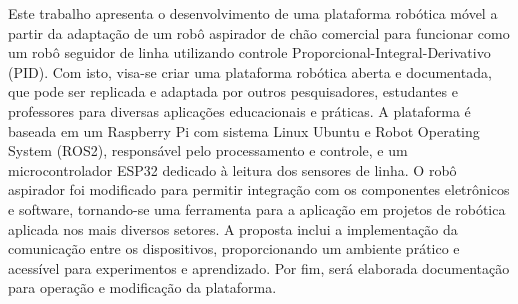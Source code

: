 Este trabalho apresenta o desenvolvimento de uma plataforma robótica móvel a partir da adaptação de um robô aspirador de chão comercial para funcionar como um robô seguidor de linha utilizando controle Proporcional-Integral-Derivativo (PID). Com isto, visa-se criar uma plataforma robótica aberta e documentada, que pode ser replicada e adaptada por outros pesquisadores, estudantes e professores para diversas aplicações educacionais e práticas. A plataforma é baseada em um Raspberry Pi com sistema Linux Ubuntu e Robot Operating System (ROS2), responsável pelo processamento e controle, e um microcontrolador ESP32 dedicado à leitura dos sensores de linha. O robô aspirador foi modificado para permitir integração com os componentes eletrônicos e software, tornando-se uma ferramenta para a aplicação em projetos de robótica aplicada nos mais diversos setores. A proposta inclui a implementação da comunicação entre os dispositivos, proporcionando um ambiente prático e acessível para experimentos e aprendizado. Por fim, será elaborada documentação para operação e modificação da plataforma.

